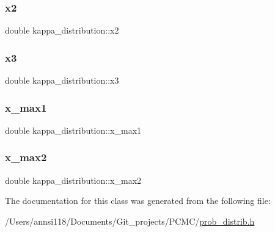 \subsubsection{\texorpdfstring{x2}{x2}}
{\footnotesize\ttfamily double kappa\+\_\+distribution\+::x2}

\hypertarget{classkappa__distribution_add191b8968caa8c0f56806ab95ab9541}{}\label{classkappa__distribution_add191b8968caa8c0f56806ab95ab9541} 
\subsubsection{\texorpdfstring{x3}{x3}}
{\footnotesize\ttfamily double kappa\+\_\+distribution\+::x3}

\hypertarget{classkappa__distribution_a1b1f2f453758df12ae36c45a2ef1442e}{}\label{classkappa__distribution_a1b1f2f453758df12ae36c45a2ef1442e} 
\subsubsection{\texorpdfstring{x\+\_\+max1}{x\_max1}}
{\footnotesize\ttfamily double kappa\+\_\+distribution\+::x\+\_\+max1}

\hypertarget{classkappa__distribution_a8ddb60e0b690eba68d3651975e0de470}{}\label{classkappa__distribution_a8ddb60e0b690eba68d3651975e0de470} 
\subsubsection{\texorpdfstring{x\+\_\+max2}{x\_max2}}
{\footnotesize\ttfamily double kappa\+\_\+distribution\+::x\+\_\+max2}



The documentation for this class was generated from the following file\+:\begin{DoxyCompactItemize}
\item 
/\+Users/annsi118/\+Documents/\+Git\+\_\+projects/\+P\+C\+M\+C/\hyperlink{prob__distrib_8h}{prob\+\_\+distrib.\+h}\end{DoxyCompactItemize}
